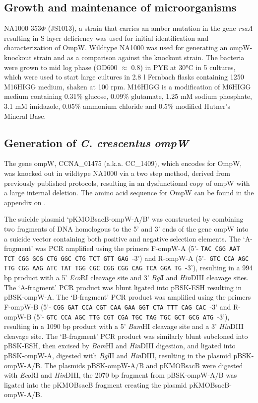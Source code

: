 \subsection{Growth and maintenance of microorganisms} 
\label{sub:porin_growth}
\caulobacter NA1000 353$\Phi$ (JS1013), a strain that carries an amber mutation in the gene \textit{rsaA} resulting in S-layer deficiency was used for initial identification and characterization of OmpW. Wildtype \caulobacter NA1000 was used for generating an ompW-knockout strain and as a comparison against the knockout strain. The bacteria were  grown to mid log phase (\ac{OD600} $\approx$ 0.8) in \ac{PYE} at 30\si{\degreeCelsius} in 5 \millilitre cultures, which were used to start large cultures in 2.8 \si{\litre} Fernbach flasks containing 1250 \millilitre M16HIGG medium, shaken at 100 rpm. M16HIGG is a modification of M6HIGG medium containing 0.31\% glucose, 0.09\% glutamate, 1.25 mM sodium phosphate, 3.1 mM imidazole, 0.05\% ammonium chloride and 0.5\% modified Hutner's Mineral Base.

\subsection{Generation of \textit{C. crescentus} \del \textit{ompW}}
\label{sub:porin_knockout}
The gene ompW, CCNA\_01475 (a.k.a. CC\_1409), which encodes for OmpW, was knocked out in wildtype \caulobacter NA1000 via a two step method, derived from previously published protocols, resulting in an dysfunctional copy of ompW with a large internal deletion. The amino acid sequence for OmpW can be found in the appendix on .

The suicide plasmid `pKMOBsacB-ompW-A/B' was constructed by combining two fragments of DNA homologous to the 5' and 3' ends of the gene ompW into a suicide vector containing both positive and negative selection elements. The `A-fragment' was \ac{PCR} amplified using the primers F-ompW-A (5'- \texttt{TAC CGG AAT TCT CGG GCG CTG GGC CTG TCT GTT GAG }-3') and R-ompW-A (5'-\texttt{ GTC CCA AGC TTG CGG AAG ATC TAT TGG CGC CGG CGG CAG TCA GGA TG }-3'), resulting in a 994 bp product with a 5' \textit{Eco}RI cleavage site and  3' \textit{Bgl}I and \textit{Hin}DIII cleavage sites.  The `A-fragment' \ac{PCR} product was blunt ligated into pBSK-ESH resulting in pBSK-ompW-A. The `B-fragment' PCR product was amplified using the primers F-ompW-B (5'- \texttt{CGG GAT CCA CGT CAA GAA GGT CTA TTT CAG CAC }-3' and R-ompW-B (5'- \texttt{GTC CCA AGC TTG CGT CGA TGC TAG TGC GCT GCG ATG }-3'), resulting in a 1090 bp product with a 5' \textit{Bam}HI cleavage site and a 3' \textit{Hin}DIII cleavage site. The `B-fragment' \ac{PCR} product was similarly blunt subcloned into pBSK-ESH, then excised by \textit{Bam}HI and \textit{Hin}DIII digestion, and ligated into pBSK-ompW-A, digested with \textit{Bgl}II and \textit{Hin}DIII, resulting in the plasmid pBSK-ompW-A/B. The plasmids pBSK-ompW-A/B and pKMOBsacB were digested with \textit{Eco}RI and \textit{Hin}DIII, the 2070 bp fragment from pBSK-ompW-A/B was ligated into the pKMOBsacB fragment creating the plasmid pKMOBsacB-ompW-A/B.

